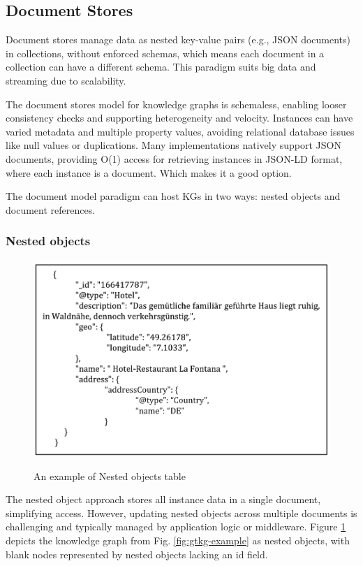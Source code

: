 \documentclass[12pt]{article}
\begin{document}
\subsection{Document Stores}
Document stores manage data as nested key-value pairs (e.g., JSON documents) in collections, without enforced schemas, which means each document in a collection can have a different schema. This paradigm suits big data and streaming due to scalability.

The document stores model for knowledge graphs is schemaless, enabling looser consistency checks and supporting heterogeneity and velocity. Instances can have varied metadata and multiple property values, avoiding relational database issues like null values or duplications. Many implementations natively support JSON documents, providing O(1) access for retrieving instances in JSON-LD format, where each instance is a document. Which makes it a good option.

The document model paradigm can host KGs in two ways: nested objects and document references.
\subsubsection{Nested objects}
\begin{figure}
    \includegraphics[width=\linewidth]{imgs/Nested objects example.jpeg}
    \label{fig:Nested-objects-example}
    \caption{An example of Nested objects table}
\end{figure}
The nested object approach stores all instance data in a single document, simplifying access. However, updating nested objects across multiple documents is challenging and typically managed by application logic or middleware.
Figure \ref{fig:Nested-objects-example} depicts the knowledge graph from Fig. \ref{fig:gtkg-example} as nested objects, with blank nodes represented by nested objects lacking an id field.
\end{document}
